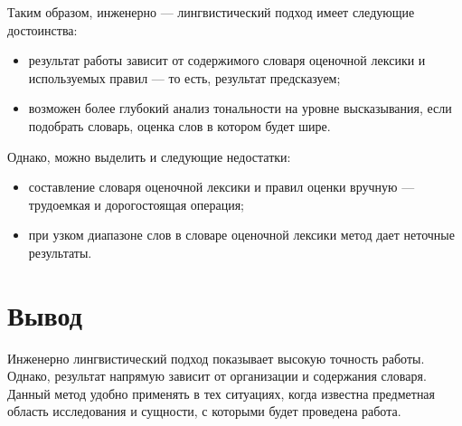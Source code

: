 Таким образом, инженерно --- лингвистический подход имеет следующие достоинства:
\begin{itemize}
	\item результат работы зависит от содержимого словаря оценочной лексики и используемых правил --- то есть, результат предсказуем;
	\item возможен более глубокий анализ тональности на уровне высказывания, если подобрать словарь, оценка слов в котором будет шире.
\end{itemize}
Однако, можно выделить и следующие недостатки:
\begin{itemize}
	\item составление словаря оценочной лексики и правил оценки вручную --- трудоемкая и дорогостоящая операция;
	\item при узком диапазоне слов в словаре оценочной лексики метод дает неточные результаты. 
\end{itemize}
\section{Вывод}
Инженерно лингвистический подход показывает высокую точность работы. Однако, результат напрямую зависит от организации и содержания словаря. Данный метод удобно применять в тех ситуациях, когда известна предметная область исследования и сущности, с которыми будет проведена работа.